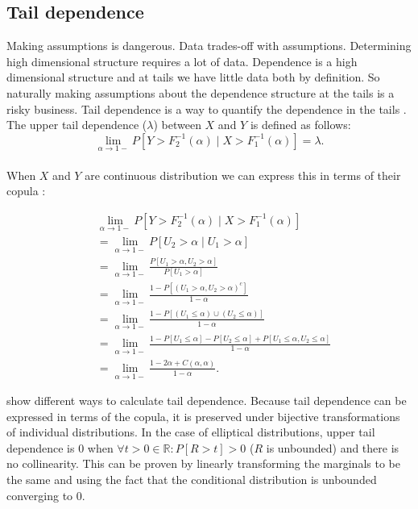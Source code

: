\documentclass[a4paper,12pt]{article}
\begin{document}
\subsection{Tail dependence}
Making assumptions is dangerous. Data trades-off with assumptions.
Determining high dimensional structure requires a lot of data.
Dependence is a high dimensional structure and at
tails we have little data both by definition. So naturally making
assumptions about the dependence structure at the tails is a risky business.
Tail dependence is a way to quantify the dependence in the tails .
The upper tail dependence ($\lambda$) between $X$ and $Y$ is defined as follows:
\begin{equation}
    \lim_{\alpha \to 1-}  P[ Y > F_{2}^{-1} ( \alpha) \mid X > F_{1}^{-1} ( \alpha) ]=\lambda.
\end{equation} \\
When $X$ and $Y$ are continuous distribution we can express this in terms
of their copula :

\begin{align}
     & \lim_{\alpha \to 1-}  P[ Y > F_{2}^{-1} ( \alpha) \mid X > F_{1}^{-1} ( \alpha) ]                                          \\
     & =\lim_{\alpha \to 1-}  P[ U_{2} >  \alpha \mid U_{1} >  \alpha ]                                                           \\
     & =\lim_{\alpha \to 1-}  \frac{P[U_{1}>\alpha,U_{2}>\alpha]}{P[U_{1}>\alpha]}                                                \\
     & =\lim_{\alpha \to 1-}  \frac{1 - P[(U_{1}>\alpha,U_{2}>\alpha)^{c}]}{1-\alpha}                                             \\
     & =\lim_{\alpha \to 1-}  \frac{1 - P[(U_{1}\le \alpha) \cup ( U_{2}\le\alpha)]}{1-\alpha}                                    \\
     & =\lim_{\alpha \to 1-}  \frac{1 - P[U_{1}\le \alpha] - P[U_{2}\le \alpha]  + P[U_{1}\le \alpha , U_{2}\le\alpha]}{1-\alpha} \\
     & =\lim_{\alpha\to1-} \frac{1-2 \alpha +C(\alpha,\alpha)} {1-\alpha}.
\end{align}

\cite{dempster_correlation_2002} show different ways to calculate tail dependence. Because
tail dependence can be expressed in terms of the copula, it is preserved under bijective transformations
of individual distributions. In the case of elliptical distributions, upper tail dependence
is $0$ when $\forall t>0 \in \mathbb{R}: P[R>t]>0$ ($R$ is unbounded) and there is no collinearity.
This can be proven by linearly transforming the marginals to be the same and using
the fact that the conditional distribution is unbounded converging to $0$.
\end{document}
